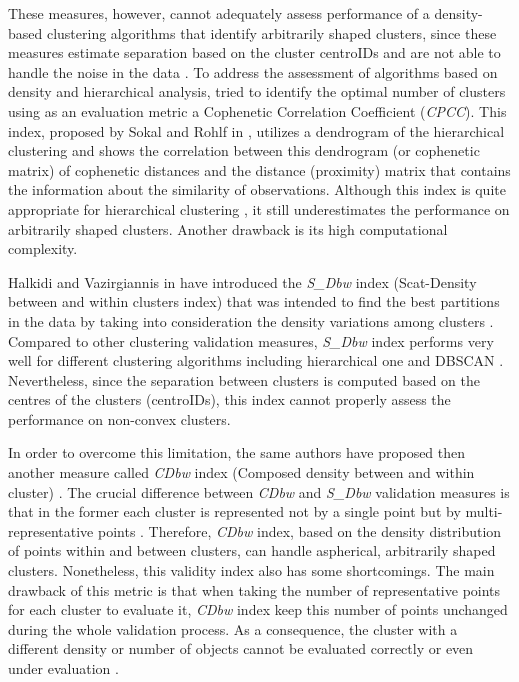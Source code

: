 \documentclass[fontsize=12pt,a4paper,twoside,openany]{scrbook}
\begin{document}
These measures, however, cannot adequately assess performance of a density-based clustering algorithms that identify arbitrarily shaped clusters, since these measures estimate separation based on the cluster centroIDs and are not able to handle the noise in the data \parencite{Moulavi14}. To address the assessment of algorithms based on density and hierarchical analysis, \textcite{Saracli13} tried to identify the optimal number of clusters using as an evaluation metric a Cophenetic Correlation Coefficient (\emph{CPCC}). This index, proposed by Sokal and Rohlf in \cite*{Sokal62}, utilizes a dendrogram of the hierarchical clustering and shows the correlation between this dendrogram (or cophenetic matrix) of cophenetic distances and the distance (proximity) matrix that contains the information about the similarity of observations. Although this index is quite appropriate for hierarchical clustering \parencite{Palacio19}, it still underestimates the performance on arbitrarily shaped clusters. Another drawback is its high computational complexity.

Halkidi and Vazirgiannis in \cite*{Halkidi01b} have introduced the \emph{S\_Dbw} index (Scat-Density between and within clusters index) that was intended to find the best partitions in the data by taking into consideration the density variations among clusters \parencite{Halkidi01b}. Compared to other clustering validation measures, \emph{S\_Dbw} index performs very well for different clustering algorithms including hierarchical one and DBSCAN \parencite{Liu10}. Nevertheless, since the separation between clusters is computed based on the centres of the clusters (centroIDs), this index cannot properly assess the performance on non-convex clusters.

In order to overcome this limitation, the same authors have proposed then another measure called \emph{CDbw} index (Composed density between and within cluster) \parencite{Halkidi08}. The crucial difference between \emph{CDbw} and \emph{S\_Dbw} validation measures is that in the former each cluster is represented not by a single point but by multi-representative points \parencite{Halkidi08}. Therefore, \emph{CDbw} index, based on the density distribution of points within and between clusters, can handle aspherical, arbitrarily shaped clusters. Nonetheless, this validity index also has some shortcomings. The main drawback of this metric is that when taking the number of representative points for each cluster to evaluate it, \emph{CDbw} index keep this number of points unchanged during the whole validation process. As a consequence, the cluster with a different density or number of objects cannot be evaluated correctly or even under evaluation \parencite{Moulavi14}.
\end{document}

